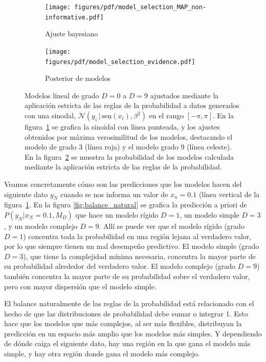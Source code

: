 \documentclass[a4paper,11pt]{book}
\newcommand{\N}{\mathcal{N}}
\theoremstyle{definition}
\begin{document}

\begin{figure}[ht!] \centering
  \begin{subfigure}[t]{0.32\textwidth}
  \centering
  \texttt{[image: figures/pdf/model\_selection\_MAP\_non-informative.pdf]}
  \caption{Ajuste bayesiano}
  \label{fig:model_selection_MAP_non-informative}
  \end{subfigure}
  \begin{subfigure}[t]{0.32\textwidth}
  \centering
  \texttt{[image: figures/pdf/model\_selection\_evidence.pdf]}
  \caption{Posterior de modelos}
  \label{fig:model_selection_evidence}
  \end{subfigure}
  \caption{Modelos lineal de grado $D=0$ a $D=9$ ajustados mediante la aplicaci\'on estricta de las reglas de la probabilidad a datos generados con una sinodal, $\N(y_i \,| \, \text{sen}(x_i), \beta^2)$ en el rango $[-\pi,\pi]$.
  En la figura~\ref{fig:model_selection_MAP_non-informative} se grafica la sinoidal con l\'inea punteada, y los ajustes obtenidos por m\'axima verosimilitud de los modelos, destacando el modelo de grado 3 (l\'inea roja) y el modelo grado 9 (l\'inea celeste).
  En la figura~\ref{fig:model_selection_evidence} se muestra la probabilidad de los modelos calculada mediante la aplicaci\'on estricta de las reglas de la probabilidad.}
  \label{fig:evaluacion_de_modelo}
\end{figure}


Veamos concretamente c\'omo son las predicciones que los modelos hacen del siguiente dato $y_N$ cuando se nos informa un valor de $x_n=0.1$ (l\'inea vertical de la figura~\ref{fig:model_selection_MAP_non-informative}.
%
En la figura \ref{fig:balance_natural} se grafica la predicci\'on a priori de $P(y_N|x_N=0.1, M_D)$ que hace un modelo r\'igido $D=1$, un modelo simple $D=3$, y un modelo complejo $D=9$.
%
All\'i se puede ver que el modelo r\'igido (grado $D=1$) concentra toda la probabilidad en una regi\'on lejana al verdadero valor, por lo que siempre tienen un mal desempe\~no predictivo.
%
El modelo simple (grado $D=3$), que tiene la complejidad m\'inima necesaria, concentra la mayor parte de su probabilidad alrededor del verdadero valor.
%
El modelo complejo (grado $D=9$) tambi\'en concentra la mayor parte de su probabilidad sobre el verdadero valor, pero con mayor dispersi\'on que el modelo simple.


El balance naturalmente de las reglas de la probabilidad est\'a relacionado con el hecho de que las distribuciones de probabilidad debe sumar o integrar 1.
%
Esto hace que los modelos que m\'as complejos, al ser m\'as flexibles, distribuyan la predicci\'on en un espacio m\'as amplio que los modelos m\'as simples.
%
Y dependiendo de d\'onde caiga el siguiente dato, hay una regi\'on en la que gana el modelo m\'as simple, y hay otra regi\'on donde gana el modelo m\'as complejo.
\end{document}
